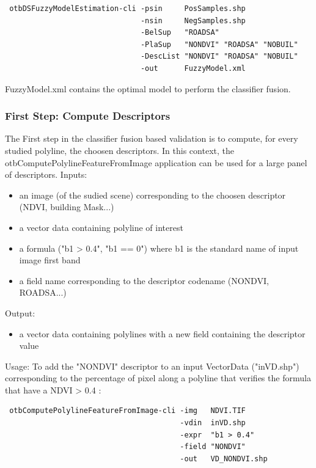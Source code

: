 \begin{verbatim}
 otbDSFuzzyModelEstimation-cli -psin     PosSamples.shp 
                               -nsin     NegSamples.shp 
                               -BelSup   "ROADSA" 
                               -PlaSup   "NONDVI" "ROADSA" "NOBUIL" 
                               -DescList "NONDVI" "ROADSA" "NOBUIL" 
                               -out      FuzzyModel.xml
\end{verbatim}

FuzzyModel.xml contains the optimal model to perform the classifier fusion.

\subsubsection{First Step: Compute Descriptors}

The First step in the classifier fusion based validation is to compute, for every studied polyline, the choosen descriptors. In this context, the otbComputePolylineFeatureFromImage application can be used for a large panel of descriptors.
Inputs:
\begin{itemize}
\item an image (of the sudied scene) corresponding to the choosen descriptor (NDVI, building Mask...)
\item a vector data containing polyline of interest
\item a formula ("b1 > 0.4", "b1 == 0") where b1 is the standard name of input image first band
\item a field name corresponding to the descriptor codename (NONDVI, ROADSA...)
\end{itemize}
Output:
\begin{itemize}
\item a vector data containing polylines with a new field containing the descriptor value
\end{itemize}
Usage: To add the "NONDVI" descriptor to an input VectorData ("inVD.shp") corresponding to the percentage of pixel along a polyline that verifies the formula that have a NDVI > 0.4 :

\begin{verbatim}
 otbComputePolylineFeatureFromImage-cli -img   NDVI.TIF 
                                        -vdin  inVD.shp 
                                        -expr  "b1 > 0.4" 
                                        -field "NONDVI" 
                                        -out   VD_NONDVI.shp
\end{verbatim}

